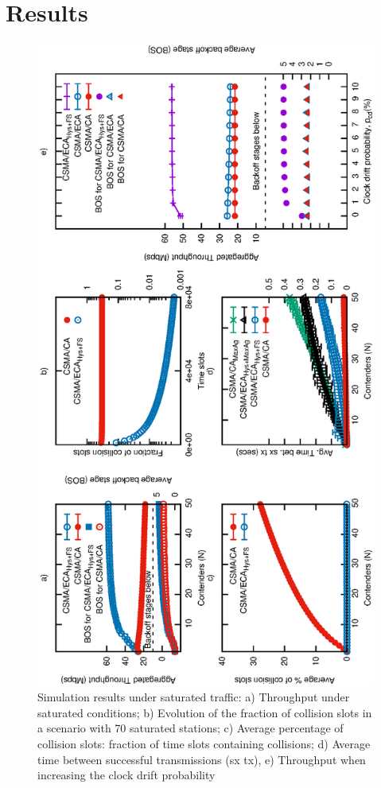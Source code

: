 
\section{Results}\label{results}
	\begin{figure}[tb]
		\centering
		\includegraphics[width=0.5\linewidth,angle=-90]{figures/tonFigs/saturation-combined.eps}
		\caption{Simulation results under saturated traffic: a) Throughput under saturated conditions; b) Evolution of the fraction of collision slots in a scenario with 70 saturated stations; c) Average percentage of collision slots: fraction of time slots containing collisions; d) Average time between successful transmissions (sx tx), e) Throughput when increasing the clock drift probability}
		\label{fig:satResults}
	\end{figure}
	
	
